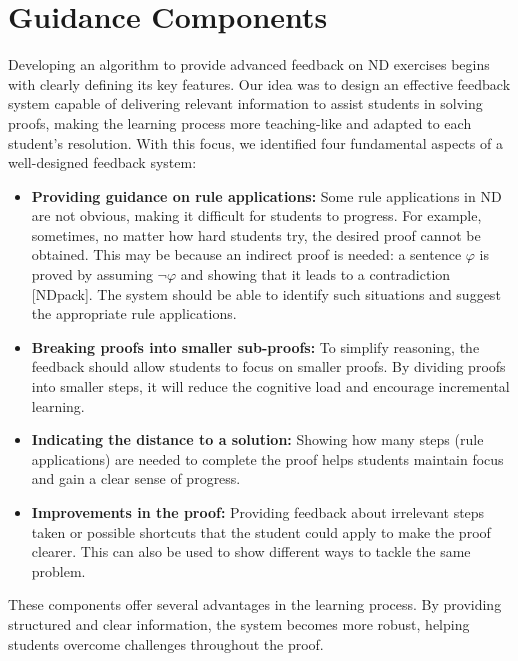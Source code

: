 \documentclass[runningheads]{llncs}
\begin{document}
\section{Guidance Components}
Developing an algorithm to provide advanced feedback on ND exercises begins with clearly defining its key features. Our idea was to design an effective feedback system capable of delivering relevant information to assist students in solving proofs, making the learning process more teaching-like and adapted to each student’s resolution. With this focus, we identified four fundamental aspects of a well-designed feedback system:

\begin{itemize}

\item \textbf {Providing guidance on rule applications:} Some rule applications in ND are not obvious, making it difficult for students to progress. For example, sometimes, no matter how hard students try, the desired proof cannot be obtained. This may be because an indirect proof is needed: a sentence \(\varphi\) is proved by assuming \(\neg \varphi\) and showing that it leads to a contradiction [NDpack]. The system should be able to identify such situations and suggest the appropriate rule applications.

\item \textbf {Breaking proofs into smaller sub-proofs:} To simplify reasoning, the feedback should allow students to focus on smaller proofs. By dividing proofs into smaller steps, it will reduce the cognitive load and encourage incremental learning. 

\item \textbf{Indicating the distance to a solution:} Showing how many steps (rule applications) are needed to complete the proof helps students maintain focus and gain a clear sense of progress.

\item \textbf{Improvements in the proof:} Providing feedback about irrelevant steps taken or possible shortcuts that the student could apply to make the proof clearer. This can also be used to show different ways to tackle the same problem.

\end{itemize}

These components offer several advantages in the learning process. By providing structured and clear information, the system becomes more robust, helping students overcome challenges throughout the proof.
\end{document}
